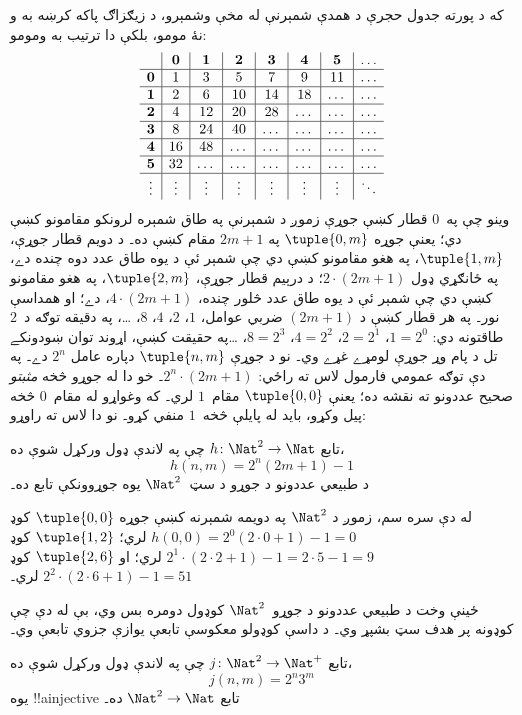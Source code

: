 \documentclass[../../../include/open-logic-section]{subfiles}
\begin{document}
\begin{explain}
که د پورته جدول حجرې د همدې شمېرنې له مخې وشمېرو، د زيګزاګ
پاکه کرښه به و نۀ مومو، بلکې دا ترتيب به ومومو:
\[
\begin{array}{ c | c | c | c | c | c | c | c }
& \mathbf 0 & \mathbf 1 & \mathbf 2 & \mathbf 3 & \mathbf 4 & \mathbf 5 & \dots \\
\hline
\mathbf 0 & 1 & 3 & 5 & 7 & 9 & 11 & \dots \\
\hline
\mathbf 1 & 2 & 6 & 10 & 14 & 18 & \dots & \dots \\
\hline
\mathbf 2 & 4 & 12 & 20 & 28 & \dots & \dots & \dots \\
\hline
\mathbf 3 & 8 & 24 & 40 & \dots & \dots & \dots & \dots \\
\hline
\mathbf 4 & 16 & 48 & \dots & \dots & \dots & \dots & \dots \\
\hline
\mathbf 5 & 32 & \dots & \dots & \dots & \dots & \dots & \dots \\
\hline
\vdots & \vdots & \vdots & \vdots & \vdots & \vdots & \vdots & \ddots\\
\end{array}
\]
وينو چې په~$0$ قطار کښې جوړې زموږ د شمېرنې په طاق شمېره
لرونکو مقامونو کښې دي؛ يعنې جوړه $\tuple{0,m}$ په $2m+1$ مقام
کښې ده۔ د دويم قطار جوړې، $\tuple{1,m}$، په هغو مقامونو کښې دي
چې شمېر ئې د يوه طاق عدد دوه چنده دے، په ځانګړي ډول
$2 \cdot (2m+1)$؛ د درېيم قطار جوړې، $\tuple{2,m}$، په هغو
مقامونو کښې دي چې شمېر ئې د يوه طاق عدد څلور چنده،
$4 \cdot (2m+1)$، دے؛ او همداسې نور۔ په هر قطار کښې د
$(2m+1)$ ضربي عوامل، $1$، $2$، $4$، $8$، \dots، په دقيقه توګه
د~$2$ طاقتونه دي: $1= 2^0$، $2 = 2^1$، $4 = 2^2$،
$8 = 2^3$، \dots\@ په حقيقت کښې، اړوند توان ښودونکے تل د پام
وړ جوړې لومړے غړے وي۔ نو د جوړې $\tuple{n,m}$ دپاره عامل
$2^n$ دے۔ په دې توګه عمومي فارمول لاس ته راځي:
$2^n \cdot (2m+1)$۔ خو دا له جوړو څخه \emph{مثبتو} صحيح عددونو
ته نقشه ده؛ يعنې $\tuple{0,0}$ مقام~$1$ لري۔ که وغواړو له
مقام~$0$ څخه پيل وکړو، بايد له پايلې څخه~$1$ منفي کړو۔ نو دا
لاس ته راوړو:
\end{explain}

\begin{ex}
تابع $h\colon \Nat^2 \to \Nat$ چې په لاندې ډول ورکړل شوې ده،
\[
h(n,m) = 2^n (2m+1) - 1
\]
د طبيعي عددونو د جوړو د سټ~$\Nat^2$ يوه جوړوونکې تابع ده۔
\end{ex}

\begin{explain}
له دې سره سم، زموږ د $\Nat^2$ په دويمه شمېرنه کښې جوړه
$\tuple{0,0}$ کوډ $h(0,0) = 2^0(2\cdot 0+1) - 1 = 0$ لري؛
$\tuple{1,2}$ کوډ $2^{1} \cdot (2 \cdot 2 + 1) - 1 = 2
\cdot 5 - 1 = 9$ لري؛ او $\tuple{2,6}$ کوډ $2^{2} \cdot (2
\cdot 6 + 1) - 1 = 51$ لري۔
\end{explain}

ځينې وخت د طبيعي عددونو د جوړو~$\Nat^2$ کوډول دومره بس وي،
بې له دې چې کوډونه پر هدف سټ بشپړ وي۔ د داسې کوډولو معکوسې
تابعې يوازې جزوي تابعې وي۔

\begin{ex}
تابع $j\colon \Nat^2 \to \Nat^+$ چې په لاندې ډول ورکړل شوې ده،
\[
j(n,m) = 2^n3^m
\]
يوه !!a{injective} تابع $\Nat^2 \to \Nat$ ده۔
\end{ex}
\end{document}
